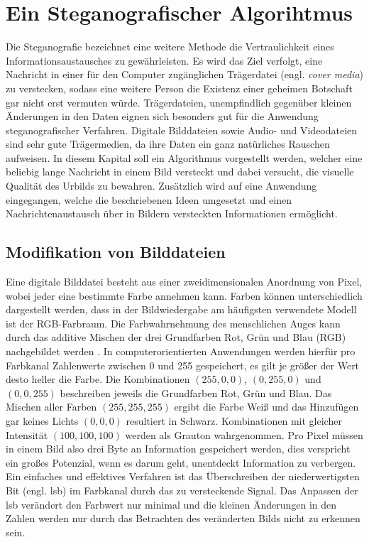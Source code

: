 \chapter{Ein Steganografischer Algorihtmus}
Die Steganografie bezeichnet eine weitere Methode die Vertraulichkeit eines
Informationsaustausches zu gewährleisten.
Es wird das Ziel verfolgt, eine Nachricht in einer für den Computer
zugänglichen Trägerdatei (engl. \textit{cover media}) zu verstecken, sodass eine
weitere Person die Existenz
einer geheimen Botschaft gar nicht erst vermuten würde. Trägerdateien, unempfindlich
gegenüber kleinen Änderungen in den Daten eignen sich besonders gut für die
Anwendung steganografischer Verfahren. Digitale Bilddateien sowie Audio- und Videodateien
sind sehr gute Trägermedien,
da ihre Daten ein ganz natürliches Rauschen aufweisen.
In diesem Kapital soll ein Algorithmus vorgestellt werden, welcher
eine beliebig lange Nachricht in einem Bild versteckt und dabei versucht,
die visuelle Qualität des Urbilds zu bewahren.
Zusätzlich wird auf eine Anwendung eingegangen, welche die beschriebenen
Ideen umgesetzt und einen Nachrichtenaustausch über
in Bildern versteckten Informationen ermöglicht.

\section{Modifikation von Bilddateien}
Eine digitale Bilddatei besteht aus einer zweidimensionalen Anordnung von Pixel, wobei
jeder eine bestimmte Farbe annehmen kann. Farben können unterschiedlich
dargestellt werden, dass in der Bildwiedergabe am häufigsten verwendete Modell ist
der RGB-Farbraum. Die Farbwahrnehmung des menschlichen Auges kann durch
das additive Mischen der drei Grundfarben Rot, Grün und Blau (RGB)
nachgebildet werden \parencite[32-40]{BOOK:VC}. In computerorientierten Anwendungen
werden hierfür pro Farbkanal Zahlenwerte zwischen 0 und 255 gespeichert,
es gilt je größer der Wert desto heller die Farbe. Die Kombinationen
$(255,0,0)$, $(0,255,0)$ und $(0,0,255)$ beschreiben jeweils die Grundfarben Rot, Grün und Blau.
Das Mischen aller Farben $(255,255,255)$ ergibt die Farbe Weiß und das Hinzufügen
gar keines Lichts $(0,0,0)$ resultiert in Schwarz. Kombinationen mit gleicher Intensität
$(100,100,100)$ werden als Grauton wahrgenommen. Pro Pixel müssen in einem Bild
also drei Byte an Information gespeichert werden, dies verspricht ein großes
Potenzial, wenn es darum geht, unentdeckt Information zu verbergen. Ein
einfaches und effektives Verfahren ist das Überschreiben der niederwertigsten
Bit (engl. \ac{lsb}) im Farbkanal
durch das zu versteckende Signal. Das Anpassen
der \acs{lsb} verändert den Farbwert nur minimal und
die kleinen Änderungen in den Zahlen werden nur durch das
Betrachten des veränderten Bilds nicht zu erkennen sein.

